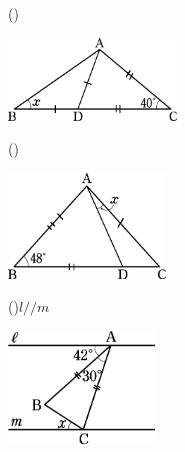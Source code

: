 \documentclass[
  12pt,a4paper,lualatex,ja=standard]{bxjsarticle}
\begin{document}
\begin{flushleft}
\begin{multicols}{2}
\begin{center}
\end{center}

\end{multicols}

\newpage

\begin{multicols}{2}
()\hspace{2.5pt}

\begin{center}
\def\@captype{figure}
\includegraphics[height=22mm]{media/tu7.jpg}

\end{center}

\columnbreak

()\hspace{2.5pt}

\begin{center}
\def\@captype{figure}
\includegraphics[height=28mm]{media/tu8.jpg}

\end{center}

\end{multicols}

\vspace{5mm}

\begin{multicols}{2}
()\hspace{2.5pt}$l /\!/m$

\begin{center}
\def\@captype{figure}
\includegraphics[height=30mm]{media/tu9.jpg}


\end{center}
\end{multicols}
\end{flushleft}
\end{document}
